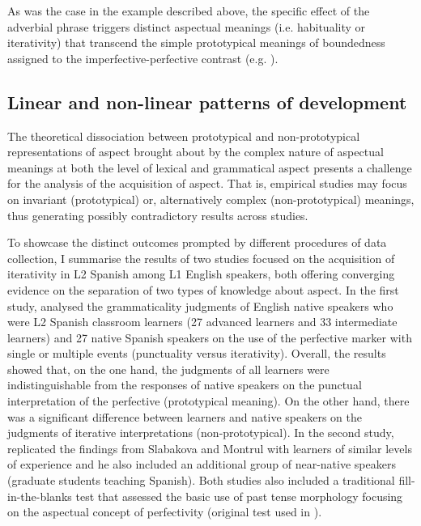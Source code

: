\documentclass[output=paper,modfonts,nonflat,newtxmath]{langsci/langscibook}
\begin{document}
As was the case in the example described above, the specific effect of the adverbial phrase triggers distinct aspectual meanings (i.e. habituality or iterativity) that transcend the simple prototypical meanings of boundedness assigned to the imperfective-perfective contrast (e.g. \citealt{SlabakovaMontrul2007, Scholes2008,Salaberry2013}).

\subsection{{Linear} {and} {non-linear} {patterns} {of} {development}}
\label{sec:salaberry:1.3}

The theoretical dissociation between prototypical and non-prototypical representations of aspect brought about by the complex nature of aspectual meanings at both the level of lexical and grammatical aspect presents a challenge for the analysis of the acquisition of aspect. That is, empirical studies may focus on invariant (prototypical) or, alternatively complex (non-prototypical) meanings, thus generating possibly contradictory results across studies.

To showcase the distinct outcomes prompted by different procedures of data collection, I summarise the results of two studies focused on the acquisition of iterativity in L2 Spanish among L1 English speakers, both offering converging evidence on the separation of two types of knowledge about aspect. In the first study, \citet{SlabakovaMontrul2007} analysed the grammaticality judgments of English native speakers who were L2 Spanish classroom learners (27 advanced learners and 33 intermediate learners) and 27 native Spanish speakers on the use of the perfective marker with single or multiple events (punctuality versus iterativity). Overall, the results showed that, on the one hand, the judgments of all learners were indistinguishable from the responses of native speakers on the punctual interpretation of the perfective (prototypical meaning). On the other hand, there was a significant difference between learners and native speakers on the judgments of iterative interpretations (non-prototypical). In the second study, \citet{Scholes2008} replicated the findings from Slabakova and Montrul with learners of similar levels of experience and he also included an additional group of near-native speakers (graduate students teaching Spanish). Both studies also included a traditional fill-in-the-blanks test that assessed the basic use of past tense morphology focusing on the aspectual concept of perfectivity (original test used in \citealt{Salaberry1999}).
\end{document}
